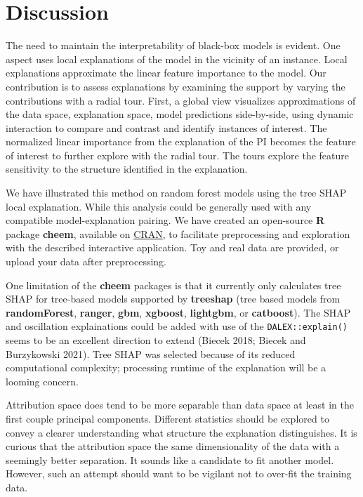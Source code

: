 \documentclass[
]{article}
\begin{document}
\hypertarget{sec:cheemdiscussion}{%
\section{Discussion}\label{sec:cheemdiscussion}}

The need to maintain the interpretability of black-box models is evident. One aspect uses local explanations of the model in the vicinity of an instance. Local explanations approximate the linear feature importance to the model. Our contribution is to assess explanations by examining the support by varying the contributions with a radial tour. First, a global view visualizes approximations of the data space, explanation space, model predictions side-by-side, using dynamic interaction to compare and contrast and identify instances of interest. The normalized linear importance from the explanation of the PI becomes the feature of interest to further explore with the radial tour. The tours explore the feature sensitivity to the structure identified in the explanation.

We have illustrated this method on random forest models using the tree SHAP local explanation. While this analysis could be generally used with any compatible model-explanation pairing. We have created an open-source \textbf{R} package \textbf{cheem}, available on \href{https://CRAN.R-project.org/package=cheem}{CRAN}, to facilitate preprocessing and exploration with the described interactive application. Toy and real data are provided, or upload your data after preprocessing.

One limitation of the \textbf{cheem} packages is that it currently only calculates tree SHAP for tree-based models supported by \textbf{treeshap} (tree based models from \textbf{randomForest}, \textbf{ranger}, \textbf{gbm}, \textbf{xgboost}, \textbf{lightgbm}, or \textbf{catboost}). The SHAP and oscillation explainations could be added with use of the \texttt{DALEX::explain()} seems to be an excellent direction to extend (Biecek 2018; Biecek and Burzykowski 2021). Tree SHAP was selected because of its reduced computational complexity; processing runtime of the explanation will be a looming concern.

Attribution space does tend to be more separable than data space at least in the first couple principal components. Different statistics should be explored to convey a clearer understanding what structure the explanation distinguishes. It is curious that the attribution space the same dimensionality of the data with a seemingly better separation. It sounds like a candidate to fit another model. However, such an attempt should want to be vigilant not to over-fit the training data.
\end{document}
